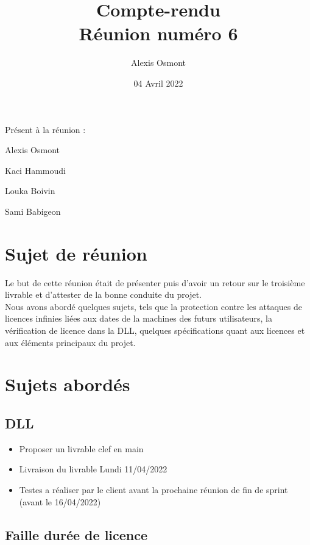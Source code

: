 \documentclass{article}
\title{
    \Huge
    Compte-rendu\\
    Réunion numéro 6\\
}
\date{\huge 04 Avril 2022}
\author{\huge Alexis Osmont\\}
\begin{document}
\maketitle
\vspace{5cm}
    Présent à la réunion :
    \begin{description}
        \item Alexis Osmont
        \item Kaci Hammoudi
        \item Louka Boivin
        \item Sami Babigeon
    \end{description}
\newpage

\section{Sujet de réunion}   

Le but de cette réunion était de présenter puis d'avoir un retour sur le troisième livrable et d'attester de la bonne conduite du projet.\\

Nous avons abordé quelques sujets, tels que la protection contre les attaques de licences infinies liées aux dates de la machines
des futurs utilisateurs, la vérification de licence dans la DLL, quelques spécifications quant aux licences et aux éléments principaux du
projet.  
\vspace{0.5cm}

\section{Sujets abordés}
\subsection{DLL}

\begin{itemize}
    \item Proposer un livrable clef en main
    \item Livraison du livrable Lundi 11/04/2022
    \item Testes a réaliser par le client avant la prochaine réunion de fin de sprint (avant le 16/04/2022)
\end{itemize}

\subsection{Faille durée de licence}
\end{document}
